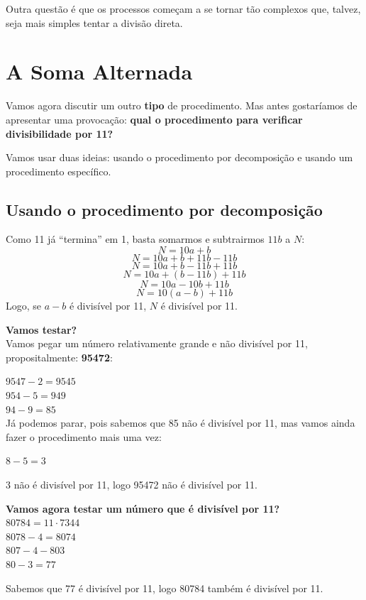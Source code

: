 \documentclass[12pt,a4paper]{article}
\begin{document}
		Outra questão é que os processos começam a se tornar tão complexos que, talvez, seja mais simples tentar a divisão direta.
		
		\newpage
		
		\section{A Soma Alternada}
		\label{sec:soma_alternada}
		
		Vamos agora discutir um outro \textbf{tipo} de procedimento. Mas antes gostaríamos de apresentar uma provocação: \textbf{qual o procedimento para verificar divisibilidade por 11?}
		
		Vamos usar duas ideias: usando o procedimento por decomposição e usando um procedimento específico.
		
		\subsection{Usando o procedimento por decomposição}
		
		Como 11 já ``termina'' em 1, basta somarmos e subtrairmos $11b$ a $N$:		
		$$N = 10a + b$$
		$$N = 10  a + b + 11b - 11b$$
		$$N = 10  a + b - 11b + 11b$$
		$$N = 10  a + (b - 11b) + 11b$$
		$$N = 10  a - 10b + 11b$$
		$$N = 10  (a - b) + 11b$$		
		Logo, se $a - b$ é divisível por 11, $N$ é divisível por 11.
		
		\textbf{Vamos testar?}\\
		Vamos pegar um número relativamente grande e não divisível por 11, propositalmente: \textbf{95472}:
		
		$9547 - 2 = 9545$\\
		$954 - 5 = 949$\\
		$94 - 9 = 85$\\
		
		Já podemos parar, pois sabemos que 85 não é divisível por 11, mas vamos ainda fazer o procedimento mais uma vez:
		
		$8 - 5 = 3$
		
		3 não é divisível por 11, logo 95472 não é divisível por 11.
		
		\textbf{Vamos agora testar um número que é divisível por 11?}\\
		$80784 = 11 \cdot 7344$\\
		$8078 - 4 = 8074$\\
		$807 - 4 - 803$\\
		$80 - 3 = 77$
				
		Sabemos que 77 é divisível por 11, logo 80784 também é divisível por 11.
		
\end{document}
